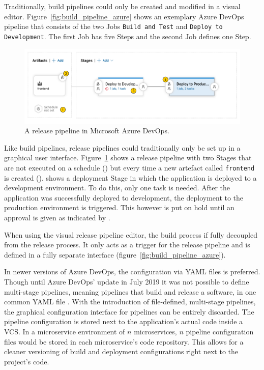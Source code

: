 Traditionally, build pipelines could only be created and modified in a visual
editor. Figure~\ref{fig:build_pipeline_azure} shows an exemplary Azure DevOps
pipeline that consists of the two Jobs \texttt{Build and Test} and
\texttt{Deploy to Development}. The first Job has five Steps and the second Job
defines one Step.

\begin{figure}[H]
\begin{center}
  \includegraphics[scale=0.45]{images/figures/azure_devops_release_pipeline_base.pdf}
\end{center}
\caption{A release pipeline in Microsoft Azure DevOps.}%
\label{fig:release_pipeline_azure}
\end{figure}

Like build pipelines, release pipelines could traditionally only be set up in a
graphical user interface. Figure~\ref{fig:release_pipeline_azure} shows a
release pipeline with two Stages that are not executed on a schedule
() but every time a new artefact called \texttt{frontend} is created
().  shows a deployment Stage in which the application is
deployed to a development environment. To do this, only one task is needed.
After the application was successfully deployed to development, the deployment
to the production environment is triggered. This however is put on hold until
an approval is given as indicated by .

When using the visual release pipeline editor, the build process if fully
decoupled from the release process. It only acts as a trigger for the release
pipeline and is defined in a fully separate interface
(figure~\ref{fig:build_pipeline_azure}).

In newer versions of Azure DevOps, the configuration via YAML files is
preferred. Though until Azure DevOps' update in July 2019 it was not possible
to define multi-stage pipelines, meaning pipelines that build and release a
software, in one common YAML file
\autocite{GuckenheimerNewAnalyticsreports2019}. With the introduction of
file-defined, multi-stage pipelines, the graphical configuration interface for
pipelines can be entirely discarded. The pipeline configuration is stored next
to the application's actual code inside a \ac{VCS}. In a microservice
environment of $n$ microservices, $n$ pipeline configuration files would be
stored in each microservice's code repository. This allows for a cleaner
versioning of build and deployment configurations right next to the project's
code.

